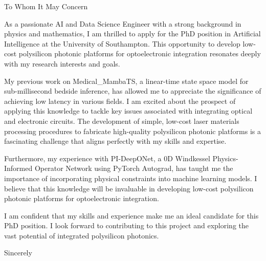 \documentclass{letter}
\begin{document}
\address{\noindent University of Southampton \\ Integrated Polysilicon Photonics \\ Southampton, United Kingdom}

\opening{\noindent To Whom It May Concern}

As a passionate AI and Data Science Engineer with a strong background in physics and mathematics, I am thrilled to apply for the PhD position in Artificial Intelligence at the University of Southampton. This opportunity to develop low-cost polysilicon photonic platforms for optoelectronic integration resonates deeply with my research interests and goals.

My previous work on Medical_MambaTS, a linear-time state space model for sub-millisecond bedside inference, has allowed me to appreciate the significance of achieving low latency in various fields. I am excited about the prospect of applying this knowledge to tackle key issues associated with integrating optical and electronic circuits. The development of simple, low-cost laser materials processing procedures to fabricate high-quality polysilicon photonic platforms is a fascinating challenge that aligns perfectly with my skills and expertise.

Furthermore, my experience with PI-DeepONet, a 0D Windkessel Physics-Informed Operator Network using PyTorch Autograd, has taught me the importance of incorporating physical constraints into machine learning models. I believe that this knowledge will be invaluable in developing low-cost polysilicon photonic platforms for optoelectronic integration.

I am confident that my skills and experience make me an ideal candidate for this PhD position. I look forward to contributing to this project and exploring the vast potential of integrated polysilicon photonics.

\closing{\noindent Sincerely}

\signature{\noindent Ismail Aissaoui}
\end{document}
